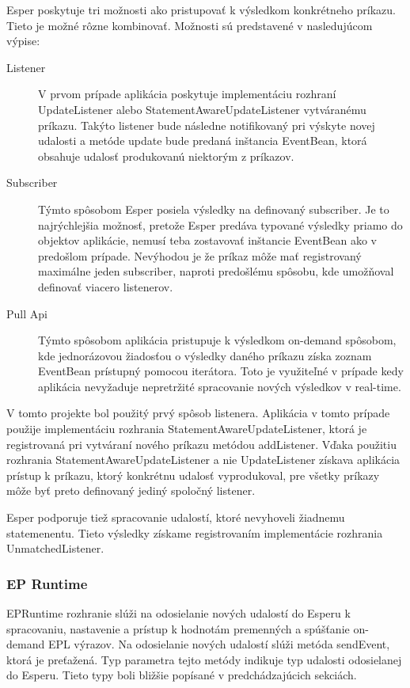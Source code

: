 		Esper poskytuje tri možnosti ako pristupovať k výsledkom konkrétneho príkazu. Tieto je možné rôzne kombinovať. Možnosti sú predstavené v nasledujúcom výpise:
		\begin{description}
			\item[Listener] V prvom prípade aplikácia poskytuje implementáciu rozhraní UpdateListener alebo StatementAwareUpdateListener vytváranému príkazu. Takýto listener bude následne notifikovaný pri výskyte novej udalosti a metóde update bude predaná inštancia EventBean, ktorá obsahuje udalosť produkovanú niektorým z príkazov.
			\item[Subscriber] Týmto spôsobom Esper posiela výsledky na definovaný subscriber. Je to najrýchlejšia možnosť, pretože Esper predáva typované výsledky priamo do objektov aplikácie, nemusí teba zostavovať inštancie EventBean ako v predošlom prípade. Nevýhodou je že príkaz môže mať registrovaný maximálne jeden subscriber, naproti predošlému spôsobu, kde umožňoval definovať viacero listenerov.
			\item[Pull Api] Týmto spôsobom aplikácia pristupuje k výsledkom on-demand spôsobom, kde jednorázovou žiadosťou o výsledky daného príkazu získa zoznam EventBean prístupný pomocou iterátora. Toto je využiteľné v prípade kedy aplikácia nevyžaduje nepretržité spracovanie nových výsledkov v real-time.
		\end{description}
		V tomto projekte bol použitý prvý spôsob listenera. Aplikácia v tomto prípade použije implementáciu rozhrania StatementAwareUpdateListener, ktorá je registrovaná pri vytváraní nového príkazu metódou addListener. Vďaka použitiu rozhrania StatementAwareUpdateListener a nie UpdateListener získava aplikácia prístup k príkazu, ktorý konkrétnu udalosť vyprodukoval, pre všetky príkazy môže byť preto definovaný jediný spoločný listener.
		
		Esper podporuje tiež spracovanie udalostí, ktoré nevyhoveli žiadnemu statemenentu. Tieto výsledky získame registrovaním implementácie rozhrania UnmatchedListener. 
		
		\subsubsection{EP Runtime}
		EPRuntime rozhranie slúži na odosielanie nových udalostí do Esperu k spracovaniu, nastavenie a prístup k hodnotám premenných a spúšťanie on-demand EPL výrazov. Na odosielanie nových udalostí slúži metóda sendEvent, ktorá je preťažená. Typ parametra tejto metódy indikuje typ udalosti odosielanej do Esperu. Tieto typy boli bližšie popísané v predchádzajúcich sekciách.
		
